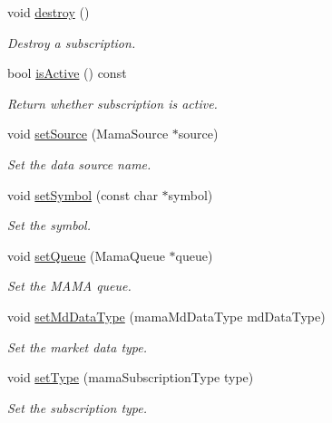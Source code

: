 \begin{CompactItemize}
void \hyperlink{classWombat_1_1MamdaSubscription_ac174832862f54a4efe387dabf0766cb}{destroy} ()
\begin{CompactList}\small\item\em Destroy a subscription. \item\end{CompactList}\item 
bool \hyperlink{classWombat_1_1MamdaSubscription_43b96fd23c3f478ad28269152177c78d}{is\-Active} () const 
\begin{CompactList}\small\item\em Return whether subscription is active. \item\end{CompactList}\item 
void \hyperlink{classWombat_1_1MamdaSubscription_4661e2eed184f9e0be3eaf19e03d80a3}{set\-Source} (Mama\-Source $\ast$source)
\begin{CompactList}\small\item\em Set the data source name. \item\end{CompactList}\item 
void \hyperlink{classWombat_1_1MamdaSubscription_b31e9fce3fd77f2e446126c1254b73f3}{set\-Symbol} (const char $\ast$symbol)
\begin{CompactList}\small\item\em Set the symbol. \item\end{CompactList}\item 
void \hyperlink{classWombat_1_1MamdaSubscription_917a279a093c277d540b3db0014187a2}{set\-Queue} (Mama\-Queue $\ast$queue)
\begin{CompactList}\small\item\em Set the MAMA queue. \item\end{CompactList}\item 
void \hyperlink{classWombat_1_1MamdaSubscription_71750674e172cbb0ad997779bd124818}{set\-Md\-Data\-Type} (mama\-Md\-Data\-Type md\-Data\-Type)
\begin{CompactList}\small\item\em Set the market data type. \item\end{CompactList}\item 
void \hyperlink{classWombat_1_1MamdaSubscription_d80680256c2a988523208bfbfe9c9ade}{set\-Type} (mama\-Subscription\-Type type)
\begin{CompactList}\small\item\em Set the subscription type. \item\end{CompactList}\item 

\end{CompactItemize}
